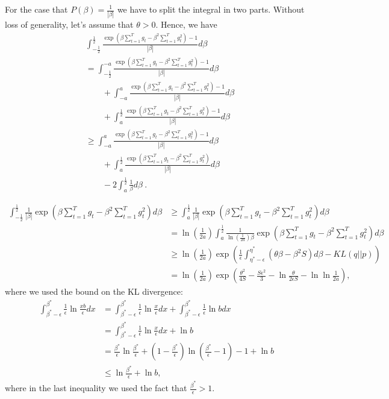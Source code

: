 \documentclass{colt2016_empty} %
\begin{document}
For the case that $P(\beta)=\frac{1}{|\beta|}$ we have to split the integral in two parts.
Without loss of generality, let's assume that $\theta>0$. Hence, we have
\begin{align}
&\int_{-\frac{1}{2}}^{\frac{1}{2}} \frac{\exp\left(\beta \sum_{t=1}^T g_t - \beta^2 \sum_{t=1}^T g_t^2 \right)-1}{|\beta|}  d \beta \\ 
&=\int_{-\frac{1}{2}}^{-a} \frac{\exp\left(\beta \sum_{t=1}^T g_t - \beta^2 \sum_{t=1}^T g_t^2 \right)-1}{|\beta|} d \beta \\
&\qquad + \int_{-a}^{a} \frac{\exp\left(\beta \sum_{t=1}^T g_t - \beta^2 \sum_{t=1}^T g_t^2 \right)-1}{|\beta|} d \beta \\
&\qquad +\int_{a}^{\frac{1}{2}} \frac{\exp\left(\beta \sum_{t=1}^T g_t - \beta^2 \sum_{t=1}^T g_t^2 \right)-1}{|\beta|} d \beta \\
&\geq \int_{-a}^{a} \frac{\exp\left(\beta \sum_{t=1}^T g_t - \beta^2 \sum_{t=1}^T g_t^2 \right)-1}{|\beta|} d \beta \\
&\qquad +\int_{a}^{\frac{1}{2}} \frac{\exp\left(\beta \sum_{t=1}^T g_t - \beta^2 \sum_{t=1}^T g_t^2 \right)}{|\beta|} d \beta \\
&\qquad - 2 \int_{a}^{\frac{1}{2}} \frac{1}{\beta} d \beta~.
\end{align}

\begin{align}
\int_{-\frac{1}{2}}^{\frac{1}{2}} \frac{1}{|\beta|} \exp\left(\beta \sum_{t=1}^T g_t - \beta^2 \sum_{t=1}^T g_t^2 \right) d \beta 
&\geq \int_{a}^{\frac{1}{2}} \frac{1}{|\beta|} \exp\left(\beta \sum_{t=1}^T g_t - \beta^2 \sum_{t=1}^T g_t^2 \right) d \beta \\
&= \ln(\frac{1}{2a}) \int_{a}^{\frac{1}{2}} \frac{1}{ \ln(\frac{1}{2a}) \beta} \exp\left(\beta \sum_{t=1}^T g_t - \beta^2 \sum_{t=1}^T g_t^2 \right) d \beta \\
&\geq \ln(\frac{1}{2a}) \exp\left(\frac{1}{\epsilon}\int_{\eta^*-\epsilon}^{\eta^*} (\theta \beta - \beta^2 S) d \beta - KL(q||p)\right) \\
&= \ln(\frac{1}{2a}) \exp\left(\frac{\theta^2}{4 S} - \frac{S \epsilon^2}{3} - \ln\frac{\theta}{2\epsilon S}- \ln \ln \frac{1}{2 a}\right),
\end{align}
where we used the bound on the KL divergence:
\begin{align}
\int_{\beta^*-\epsilon}^{\beta^*} \frac{1}{\epsilon} \ln \frac{x b}{\epsilon} d x 
&= \int_{\beta^*-\epsilon}^{\beta^*} \frac{1}{\epsilon} \ln \frac{x}{\epsilon} d x
+ \int_{\beta^*-\epsilon}^{\beta^*} \frac{1}{\epsilon} \ln b d x \\
&= \int_{\beta^*-\epsilon}^{\beta^*} \frac{1}{\epsilon} \ln \frac{x}{\epsilon} d x
+ \ln b\\
&= \frac{\beta^*}{\epsilon} \ln \frac{\beta^*}{\epsilon} + \left(1-\frac{\beta^*}{\epsilon}\right) \ln \left(\frac{\beta^*}{\epsilon}-1\right)-1 + \ln b \\
&\leq \ln \frac{\beta^*}{\epsilon} + \ln b,
\end{align}
where in the last inequality we used the fact that $\tfrac{\beta^*}{\epsilon}>1$.
\end{document}
